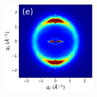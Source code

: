 \documentclass[journal=jpcbfk,manuscript=article]{achemso}
\begin{document}
\begin{figure}[!htb]
\begin{subfigure}{0.88\textwidth}
\begin{subfigure}{0.28\linewidth}
\begin{subfigure}{\textwidth}
			\end{subfigure}
			
			\begin{subfigure}{\textwidth}
				\centering
			    \includegraphics[width=\linewidth]{rzplot_offset_300K_disorder_jet_nocbar.pdf}
			\end{subfigure}
	\end{subfigure}
	\end{subfigure}
	\begin{subfigure}{0.1\textwidth}
		\centering

\end{subfigure}
\end{figure}
\end{document}
